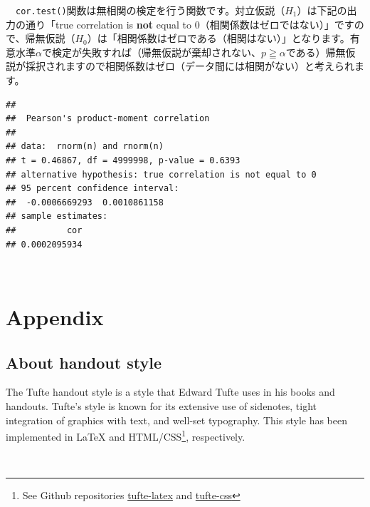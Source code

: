 \documentclass[]{tufte-handout}
\begin{document}
　\texttt{cor.test()}関数は無相関の検定を行う関数です。対立仮説（\(H_1\)）は下記の出力の通り「true
correlation is \textbf{not} equal to
0（相関係数はゼロではない）」ですので、帰無仮説（\(H_0\)）は「相関係数はゼロである（相関はない）」となります。有意水準\(\alpha\)で検定が失敗すれば（帰無仮説が棄却されない、\(p \geqq \alpha\)である）帰無仮説が採択されますので相関係数はゼロ（データ間には相関がない）と考えられます。

\begin{verbatim}
## 
##  Pearson's product-moment correlation
## 
## data:  rnorm(n) and rnorm(n)
## t = 0.46867, df = 4999998, p-value = 0.6393
## alternative hypothesis: true correlation is not equal to 0
## 95 percent confidence interval:
##  -0.0006669293  0.0010861158
## sample estimates:
##          cor 
## 0.0002095934
\end{verbatim}

　

\hypertarget{appendix}{%
\section{Appendix}\label{appendix}}

\hypertarget{about-handout-style}{%
\subsection{About handout style}\label{about-handout-style}}

The Tufte handout style is a style that Edward Tufte uses in his books
and handouts. Tufte's style is known for its extensive use of sidenotes,
tight integration of graphics with text, and well-set typography. This
style has been implemented in LaTeX and HTML/CSS\footnote{See Github
  repositories
  \href{https://github.com/tufte-latex/tufte-latex}{tufte-latex} and
  \href{https://github.com/edwardtufte/tufte-css}{tufte-css}},
respectively.

　


\end{document}
